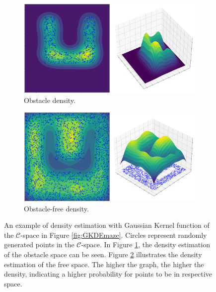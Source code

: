 \documentclass{ctuthesis}
\begin{document}
\begin{figure}[!ht]
  \centering 
  \begin{subfigure}[b]{1\textwidth}
      \includegraphics[width=\textwidth]{figChap4/GKDE_obsU.pdf}
      \caption{Obstacle density.}
      \label{fig:GKDEobstacleSpace}
  \end{subfigure}  
  \begin{subfigure}[b]{1\textwidth}
      \includegraphics[width=\textwidth]{figChap4/GKDE_freeU.pdf}
      \caption{Obstacle-free density.}
      \label{fig:GKDEfreeSpace}
  \end{subfigure}
  \caption{An example of density estimation with Gaussian Kernel function 
  of the $\mathcal{C}$-space in Figure \ref{fig:GKDEmaze}. 
  Circles represent randomly generated points in the $\mathcal{C}$-space. 
  In Figure \ref{fig:GKDEobstacleSpace}, the density estimation of the 
  obstacle space can be seen. 
  Figure \ref{fig:GKDEfreeSpace} illustrates the density estimation of the free space. 
  The higher the graph, 
  the higher the density, indicating a higher probability for points to be in respective space.}
  \label{fig:GKDEdensity}
\end{figure}
\end{document}
